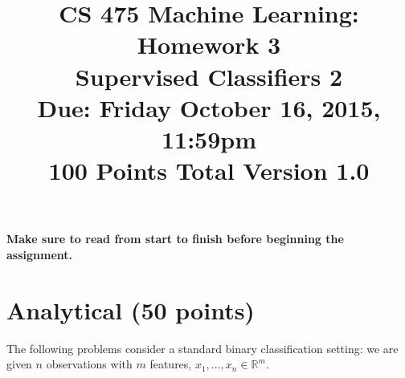 \documentclass[11pt]{article}
\title{CS 475 Machine Learning: Homework 3\\Supervised Classifiers 2\\
\Large{Due: Friday October 16, 2015, 11:59pm}\\
100 Points Total \hspace{1cm} Version 1.0}
\author{}
\date{}
\begin{document}
\large
\maketitle
\thispagestyle{headings}

\vspace{-.5in}

{\bf Make sure to read from start to finish before beginning the assignment.}

\section{Analytical (50 points)}

The following problems consider a standard binary classification setting: we are given $n$ observations with $m$ features, $x_1,...,x_n \in \mathbb{R}^m$.
\end{document}
